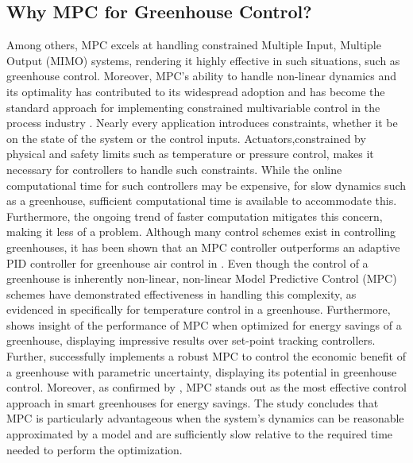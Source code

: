 \subsection{Why MPC for Greenhouse Control?}
Among others, MPC excels at handling constrained Multiple Input, Multiple Output (MIMO) systems, rendering it highly effective in such situations, such as greenhouse control. Moreover, MPC's ability to handle non-linear dynamics and its optimality has contributed to its widespread adoption and has become the standard approach for implementing constrained multivariable control in the process industry \cite{daiDiscreteTimeModelPredictive2012}. Nearly every application introduces constraints, whether it be on the state of the system or the control inputs. Actuators,constrained by physical and safety limits such as temperature or pressure control, makes it necessary for controllers to handle such constraints. While the online computational time for such controllers may be expensive, for slow dynamics such as a greenhouse, sufficient computational time is available to accommodate this. Furthermore, the ongoing trend of faster computation mitigates this concern, making it less of a problem.
Although many control schemes exist in controlling greenhouses, it has been shown that an MPC controller outperforms an adaptive PID controller for greenhouse air control in \cite{ghoumariNonlinearConstrainedMPC2005}. Even though the control of a greenhouse is inherently non-linear, non-linear Model Predictive Control (MPC) schemes have demonstrated effectiveness in handling this complexity, as evidenced in \cite{gruberNonlinearMPCBased2011, montoyaHybridcontrolledApproachMaintaining2016} specifically for temperature control in a greenhouse. Furthermore, \cite{bersaniModelPredictiveControl2020} shows insight of the performance of MPC when optimized for energy savings of a greenhouse, displaying impressive results over set-point tracking controllers. Further, \cite{boersmaRobustSamplebasedModel2022} successfully implements a robust MPC to control the economic benefit of a greenhouse with parametric uncertainty, displaying its potential in greenhouse control. Moreover, as confirmed by \cite{bersaniModelPredictiveControl2020}, MPC stands out as the most effective control approach in smart greenhouses for energy savings. The study concludes that MPC is particularly advantageous when the system's dynamics can be reasonable approximated by a model and are sufficiently slow relative to the required time needed to perform the optimization.


